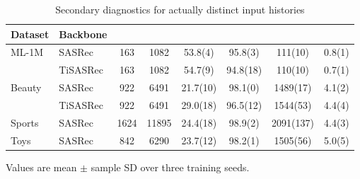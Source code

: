 \begin{table}[!htbp]
\centering
\caption{Secondary diagnostics for actually distinct input histories}
\label{tab:secondary}
\fontsize{8.5}{11}\selectfont
\setlength{\tabcolsep}{2.2pt}
\begin{tabular*}{\textwidth}{@{\extracolsep{\fill}}llS[table-format=4.0]S[table-format=5.0]S[table-format=2.1(3)]S[table-format=2.1(3)]S[table-format=4.0(3),table-align-uncertainty=false]S[table-format=2.1(3)]@{}}
\toprule
Dataset & Backbone & {} & {} & {} & {} & {} & {}\\
\midrule
ML-1M & SASRec & 163 & 1082 & 53.8(4) & 95.8(3) & 111(10) & 0.8(1)\\ %
 & TiSASRec & 163 & 1082 & 54.7(9) & 94.8(18) & 110(10) & 0.7(1)\\ %
Beauty & SASRec & 922 & 6491 & 21.7(10) & 98.1(0) & 1489(17) & 4.1(2)\\ %
 & TiSASRec & 922 & 6491 & 29.0(18) & 96.5(12) & 1544(53) & 4.4(4)\\ %
Sports & SASRec & 1624 & 11895 & 24.4(18) & 98.9(2) & 2091(137) & 4.4(3)\\ %
Toys & SASRec & 842 & 6290 & 23.7(12) & 98.2(1) & 1505(56) & 5.0(5)\\ %
\bottomrule
\end{tabular*}
\par\smallskip\noindent\begin{minipage}{\textwidth}\fontsize{8.5}{11}\selectfont Values are mean $\pm$ sample SD over three training seeds.
\end{minipage}
\end{table}
